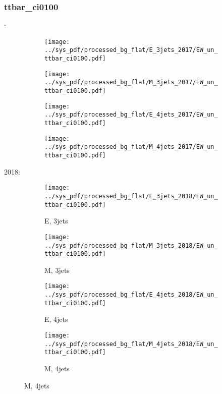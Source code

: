 \documentclass{beamer}
\begin{document}
\begin{frame}
\frametitle{ttbar_ci0100}
\fontsize{5}{1}:
\begin{figure}
\centering
\begin{subfigure}[b]{0.24\textwidth}
\texttt{[image: ../sys\_pdf/processed\_bg\_flat/E\_3jets\_2017/EW\_un\_ttbar\_ci0100.pdf]}
\end{subfigure}
\begin{subfigure}[b]{0.24\textwidth}
\texttt{[image: ../sys\_pdf/processed\_bg\_flat/M\_3jets\_2017/EW\_un\_ttbar\_ci0100.pdf]}
\end{subfigure}
\begin{subfigure}[b]{0.24\textwidth}
\texttt{[image: ../sys\_pdf/processed\_bg\_flat/E\_4jets\_2017/EW\_un\_ttbar\_ci0100.pdf]}
\end{subfigure}
\begin{subfigure}[b]{0.24\textwidth}
\texttt{[image: ../sys\_pdf/processed\_bg\_flat/M\_4jets\_2017/EW\_un\_ttbar\_ci0100.pdf]}
\end{subfigure}
\end{figure}
2018:
\begin{figure}
\centering
\begin{subfigure}[b]{0.24\textwidth}
\texttt{[image: ../sys\_pdf/processed\_bg\_flat/E\_3jets\_2018/EW\_un\_ttbar\_ci0100.pdf]}
\captionsetup{font=tiny}
\caption{E, 3jets}
\end{subfigure}
\begin{subfigure}[b]{0.24\textwidth}
\texttt{[image: ../sys\_pdf/processed\_bg\_flat/M\_3jets\_2018/EW\_un\_ttbar\_ci0100.pdf]}
\captionsetup{font=tiny}
\caption{M, 3jets}
\end{subfigure}
\begin{subfigure}[b]{0.24\textwidth}
\texttt{[image: ../sys\_pdf/processed\_bg\_flat/E\_4jets\_2018/EW\_un\_ttbar\_ci0100.pdf]}
\captionsetup{font=tiny}
\caption{E, 4jets}
\end{subfigure}
\begin{subfigure}[b]{0.24\textwidth}
\texttt{[image: ../sys\_pdf/processed\_bg\_flat/M\_4jets\_2018/EW\_un\_ttbar\_ci0100.pdf]}
\captionsetup{font=tiny}
\caption{M, 4jets}
\end{subfigure}
\end{figure}
\end{frame}
\end{document}
